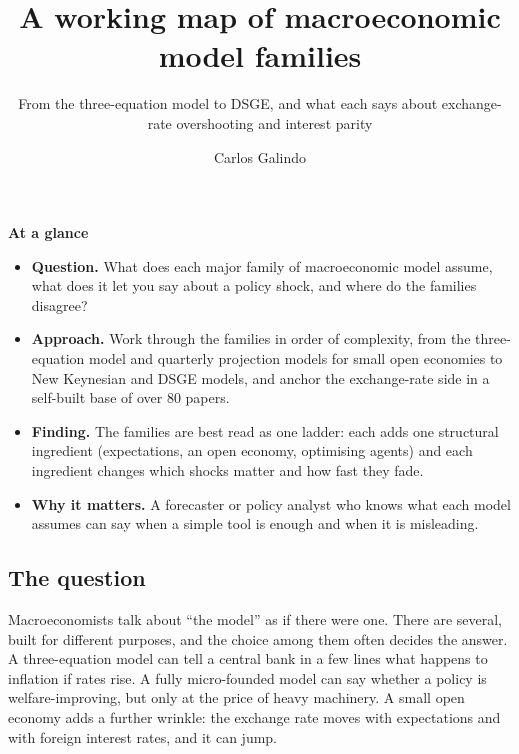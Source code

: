 \documentclass[
  british,
  a4paper,
]{article}
\title{A working map of macroeconomic model families}
\subtitle{From the three-equation model to DSGE, and what each says
about exchange-rate overshooting and interest parity}
\author{Carlos Galindo}
\date{}
\providecommand{\tightlist}{%
  \setlength{\itemsep}{0pt}\setlength{\parskip}{0pt}}
\begin{document}
\maketitle


\begin{tcolorbox}[enhanced jigsaw, arc=.35mm, bottomrule=.15mm, breakable, colback=white, colframe=quarto-callout-note-color-frame, left=2mm, leftrule=.75mm, opacityback=0, rightrule=.15mm, toprule=.15mm]

\vspace{-3mm}\textbf{At a glance}\vspace{3mm}

\begin{itemize}
\tightlist
\item
  \textbf{Question.} What does each major family of macroeconomic model
  assume, what does it let you say about a policy shock, and where do
  the families disagree?
\item
  \textbf{Approach.} Work through the families in order of complexity,
  from the three-equation model and quarterly projection models for
  small open economies to New Keynesian and DSGE models, and anchor the
  exchange-rate side in a self-built base of over 80 papers.
\item
  \textbf{Finding.} The families are best read as one ladder: each adds
  one structural ingredient (expectations, an open economy, optimising
  agents) and each ingredient changes which shocks matter and how fast
  they fade.
\item
  \textbf{Why it matters.} A forecaster or policy analyst who knows what
  each model assumes can say when a simple tool is enough and when it is
  misleading.
\end{itemize}

\end{tcolorbox}

\subsection{The question}\label{the-question}

Macroeconomists talk about ``the model'' as if there were one. There are
several, built for different purposes, and the choice among them often
decides the answer. A three-equation model can tell a central bank in a
few lines what happens to inflation if rates rise. A fully micro-founded
model can say whether a policy is welfare-improving, but only at the
price of heavy machinery. A small open economy adds a further wrinkle:
the exchange rate moves with expectations and with foreign interest
rates, and it can jump.
\end{document}

